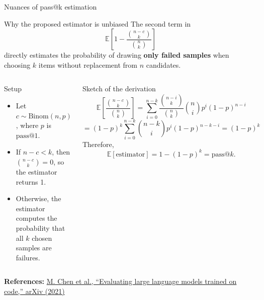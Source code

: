 \documentclass[aspectratio=43,9pt]{beamer}
\newcommand{\srclink}[2]{\href{#2}{\textcolor{black!68}{#1}}}
\newcommand{\refline}[2][References]{%
  \vfill
  {\raggedright\fontsize{5.1}{5.5}\selectfont\color{black!68}\textbf{#1:} #2\par}%
}
\newcommand{\srcChen}{\srclink{M. Chen et al., ``Evaluating large language models trained on code,'' arXiv (2021)}{https://arxiv.org/abs/2107.03374}}
\begin{document}
\begin{frame}{Nuances of pass@k estimation}
\scriptsize
\begin{block}{Why the proposed estimator is unbiased}
The second term in
\[
\mathbb{E}\left[1 - \frac{\binom{n-c}{k}}{\binom{n}{k}}\right]
\]
directly estimates the probability of drawing \textbf{only failed samples} when choosing \(k\) items without replacement from \(n\) candidates.
\end{block}

\begin{columns}[T,totalwidth=\textwidth]
\begin{block}{Setup}
\begin{itemize}
  \item Let \(c \sim \mathrm{Binom}(n,p)\), where \(p\) is \(\mathrm{pass@}1\).
  \item If \(n-c < k\), then \(\binom{n-c}{k}=0\), so the estimator returns 1.
  \item Otherwise, the estimator computes the probability that all \(k\) chosen samples are failures.
\end{itemize}
\end{block}

\begin{block}{Sketch of the derivation}
\[
\mathbb{E}\!\left[\frac{\binom{n-c}{k}}{\binom{n}{k}}\right]
= \sum_{i=0}^{n-k} \frac{\binom{n-i}{k}}{\binom{n}{k}}\binom{n}{i}p^i(1-p)^{n-i}
\]
\[
= (1-p)^k \sum_{i=0}^{n-k} \binom{n-k}{i}p^i(1-p)^{n-k-i}
= (1-p)^k
\]
Therefore,
\[
\mathbb{E}[\mathrm{estimator}] = 1-(1-p)^k = \mathrm{pass@}k.
\]
\end{block}
\end{columns}

\refline{\srcChen}
\end{frame}
\end{document}
